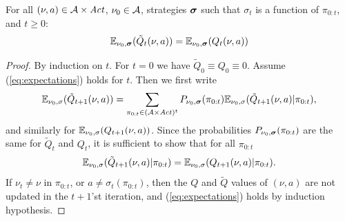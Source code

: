 \documentclass{llncs}
\begin{document}
\begin{theorem}
For all $(\nu,a)\in \mathcal{A}\times\mathit{Act}$, $\nu_0\in\mathcal{A}$, strategies $\boldsymbol{\sigma}$ such that
$\sigma_t$ is a function of $\pi_{0:t}$, and $t\geq 0$:
\begin{equation}
\label{eq:expectations}
\mathbb{E}_{\nu_0,\boldsymbol{\sigma}}(\tilde{Q}_t(\nu,a))=\mathbb{E}_{\nu_0,\boldsymbol{\sigma}}({Q}_t(\nu,a))
\end{equation}
\end{theorem}


\begin{proof}
By induction on $t$. For $t=0$ we have $\tilde{Q}_0\equiv Q_0 \equiv 0$. Assume (\ref{eq:expectations})
holds for $t$. Then we first write
\begin{equation}
\mathbb{E}_{\nu_0,\sigma}(\tilde{Q}_{t+1}(\nu,a)) =
\sum_{\pi_{0:t}\in (\mathcal{A}\times\mathit{Act})^t} P_{\nu_0,\boldsymbol{\sigma}}(\pi_{0:t})\mathbb{E}_{\nu_0,\sigma}(\tilde{Q}_{t+1}(\nu,a)|\pi_{0:t}),
\end{equation}
and similarly for $\mathbb{E}_{\nu_0,\sigma}({Q}_{t+1}(\nu,a))$. Since the probabilities
$P_{\nu_0,\boldsymbol{\sigma}}(\pi_{0:t})$ are the same for $\tilde{Q}_{t}$ and ${Q}_{t}$, it is sufficient to show
that for all $\pi_{0:t}$
\begin{equation}
\mathbb{E}_{\nu_0,\sigma}(\tilde{Q}_{t+1}(\nu,a)|\pi_{0:t})=\mathbb{E}_{\nu_0,\sigma}({Q}_{t+1}(\nu,a)|\pi_{0:t}).
\end{equation}
If $\nu_{t}\neq \nu$ in $\pi_{0:t}$, or $a\neq \sigma_t(\pi_{0:t})$, then the $Q$ and $\tilde{Q}$ values
of $(\nu,a)$ are not updated in the $t+1$'st iteration, and (\ref{eq:expectations}) holds by induction
hypothesis.


\end{proof}
\end{document}
